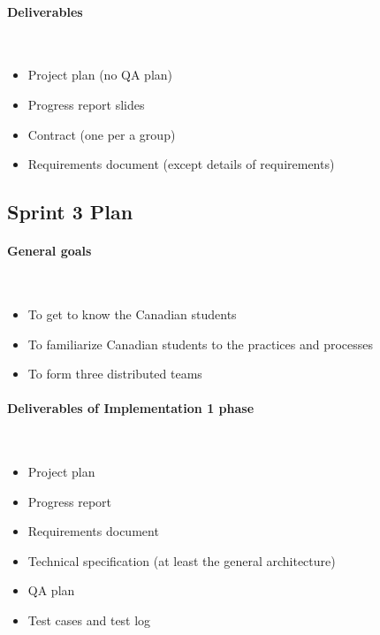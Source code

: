 \paragraph{Deliverables}~
\begin{itemize}
  \item Project plan (no QA plan) \checked
  \item Progress report slides \checked
  \item Contract (one per a group) \checked
  \item Requirements document (except details of requirements) \checked
\end{itemize}

\subsection{Sprint 3 Plan}

\paragraph{General goals}~
\begin{itemize}
  \item To get to know the Canadian students
  \item To familiarize Canadian students to the practices and processes
  \item To form three distributed teams
\end{itemize}

\paragraph{Deliverables of Implementation 1 phase}~
\begin{itemize}
  \item Project plan
  \item Progress report
  \item Requirements document 
  \item Technical specification (at least the general architecture)
  \item QA plan 
  \item Test cases and test log
\end{itemize}

